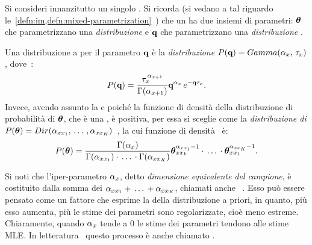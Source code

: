 Si consideri innanzitutto un singolo \mprocess*{}. Si ricorda (si vedano a tal riguardo le~\cref{defn:im,defn:mixed-parametrization}~) che un \mprocess*{} ha due insiemi di parametri: $\boldsymbol{\textbf{\text{$\theta$}}}$ che parametrizzano una \emph{distribuzione } e $\boldsymbol{\textbf{\text{q}}}$ che parametrizzano una \emph{distribuzione }.

Una distribuzione a  per il parametro $\boldsymbol{\textbf{\text{q}}}$ è la \emph{distribuzione } $P(\boldsymbol{\textbf{\text{q}}})=Gamma(\alpha_{\mathnormal{x}},\,\tau_{\mathnormal{x}})$, dove~\citep[si veda][]{Nodelman2007}:
\begin{equation}\label{eq:ctbn-bayesian-params-gamma}
P(\boldsymbol{\textbf{\text{q}}})=\frac{ \tau_{\mathnormal{x}}^{\,\alpha_{\mathnormal{x}+1}} }{ \Gamma(\alpha_{\mathnormal{x}+1}) } \boldsymbol{\textbf{\text{q}}}^{ \alpha_{\mathnormal{x}} } \, e^{ -\boldsymbol{\textbf{\text{q}}}\tau_{\mathnormal{x}} } \text{.}
\end{equation}
Invece, avendo assunto la \emph{} e poiché la funzione di densità della distribuzione di probabilità di $\boldsymbol{\textbf{\text{$\theta$}}}$, che è una , è positiva, per essa si sceglie come  la \emph{distribuzione di } $P(\boldsymbol{\textbf{\text{$\theta$}}})=Dir(\alpha_{\mathnormal{x}\mathnormal{x}_1},\,\dotsc\,,\alpha_{\mathnormal{x}\mathnormal{x}_K})$~\citep[si veda][]{Heckerman1996,Heckerman1995}, la cui funzione di densità~\citep{Steck2002} è:
\begin{equation}\label{eq:ctbn-bayesian-params-dirichlet}
P(\boldsymbol{\textbf{\text{$\theta$}}})=\frac{ \Gamma(\alpha_{\mathnormal{x}}) }{ \Gamma(\alpha_{\mathnormal{x}\mathnormal{x}_1}) \cdot \,\dotsc\, \cdot \Gamma(\alpha_{\mathnormal{x}\mathnormal{x}_K}) } \boldsymbol{\textbf{\text{$\theta$}}}_{\mathnormal{x}\mathnormal{x}_k}^{\alpha_{\mathnormal{x}\mathnormal{x}_1}-1} \cdot \,\dotsc\, \cdot \boldsymbol{\textbf{\text{$\theta$}}}_{\mathnormal{x}\mathnormal{x}_1}^{\alpha_{\mathnormal{x}\mathnormal{x}_K}-1} \text{.}
\end{equation}
\begin{notas}
Si noti che l'iper-parametro $\alpha_{\mathnormal{x}}$, detto \emph{dimensione equivalente del campione}, è costituito dalla somma dei \emph{} $\alpha_{\mathnormal{x}\mathnormal{x}_1} + \, \dotsc \, + \alpha_{\mathnormal{x}\mathnormal{x}_K}$, chiamati anche \emph{}~\citep{Steck2002}. Esso può essere pensato come un fattore che esprime la \emph{} della distribuzione a priori, in quanto, più esso aumenta, più le stime dei parametri sono regolarizzate, cioè meno estreme. Chiaramente, quando $\alpha_{\mathnormal{x}}$ tende a $0$ le stime dei parametri tendono alle stime \acl{MLE}. In letteratura~\citep[si veda][]{Steck2002} questo processo è anche chiamato \emph{}.
\end{notas}
